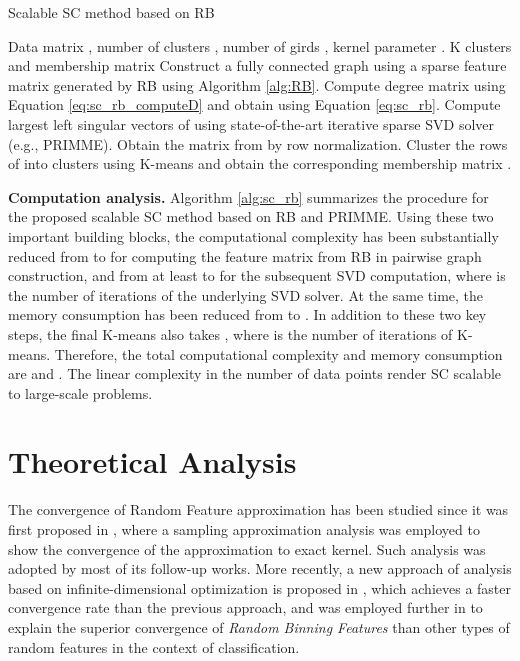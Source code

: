 \documentclass[sigconf]{acmart}
\newcommand{\1}{\boldsymbol{1}}
\newcommand{\0}{\boldsymbol{0}}
\begin{document}
\begin{algorithm}[t]
    \caption{ Scalable SC method based on RB}
    \label{alg:sc_rb}
    \begin{algorithmic}[1]
      Data matrix ,  number of clusters , number of girds , kernel parameter .
     K clusters and membership matrix 
    \STATE Construct a fully connected graph using a sparse feature matrix  generated by RB using Algorithm \ref{alg:RB}.
    \STATE Compute degree matrix  using Equation \ref{eq:sc_rb_computeD} and obtain  using Equation \ref{eq:sc_rb}.
    \STATE Compute  largest left singular vectors  of  using state-of-the-art iterative sparse SVD solver  (e.g., PRIMME).
    \STATE Obtain the matrix  from  by row normalization.
    \STATE Cluster the rows of  into  clusters using K-means and obtain the corresponding membership matrix .
    \end{algorithmic}
\end{algorithm}

\textbf{Computation analysis.} Algorithm \ref{alg:sc_rb} summarizes the procedure for the proposed scalable SC method based on RB and PRIMME. Using these two important building blocks, the computational complexity has been substantially reduced from  to  for computing the feature matrix  from RB in pairwise graph construction, and from at least  to  for the subsequent SVD computation, where  is the number of iterations of the underlying SVD solver. At the same time, the memory consumption has been reduced from  to . In addition to these two key steps, the final K-means also takes , where  is the number of iterations of K-means. Therefore, the total computational complexity and memory consumption are  and . The linear complexity in the number  of data points render SC scalable to large-scale problems.


\section{Theoretical Analysis}
The convergence of Random Feature approximation has been studied since it was first proposed in \cite{rahimi2008random}, where a sampling approximation analysis was employed to show the convergence of the approximation to exact kernel. Such analysis was adopted by most of its follow-up works. More recently, a new approach of analysis based on infinite-dimensional optimization is proposed in \cite{yen2014sparse}, which achieves a faster convergence rate than the previous approach, and was employed further in \cite{wu2016revisiting} to explain the superior convergence of \emph{Random Binning Features} than other types of random features in the context of classification.
\end{document}
